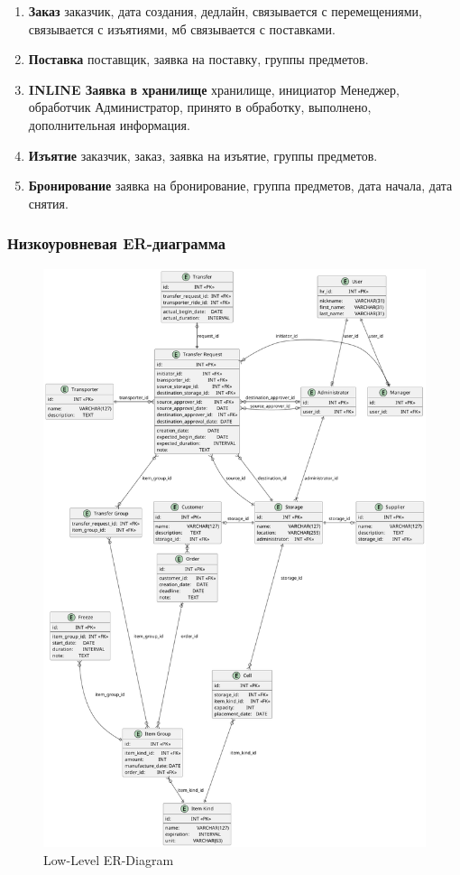 \begin{enumerate}
  \item \textbf{Заказ}
        заказчик,
        дата создания,
        дедлайн,
        связывается с перемещениями,
        связывается с изъятиями,
        мб связывается с поставками.

  \item \textbf{Поставка}
        поставщик,
        заявка на поставку,
        группы предметов.

  \item \textbf{INLINE Заявка в хранилище}
        хранилище,
        инициатор Менеджер,
        обработчик Администратор,
        принято в обработку,
        выполнено,
        дополнительная информация.

  \item \textbf{Изъятие}
        заказчик,
        заказ,
        заявка на изъятие,
        группы предметов.
  
  \item \textbf{Бронирование}
        заявка на бронирование,
        группа предметов,
        дата начала,
        дата снятия.

\end{enumerate}

\subsubsection{Низкоуровневая ER-диаграмма}

\begin{figure}[h]
      \centering
      \includegraphics[width=12cm]{../../out/spec/figure/er/low-level/Storage Net ER Diagram.png}
      \caption{Low-Level ER-Diagram}
\end{figure}